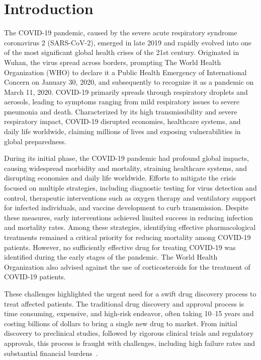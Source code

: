 \section{Introduction}
\label{chap:Introduction}

The COVID-19 pandemic, caused by the severe acute respiratory syndrome coronavirus 2 (SARS-CoV-2), emerged in late 2019 and rapidly evolved into one of the most significant global health crises of the 21st century. Originated in Wuhan, the virus spread across borders, prompting The World Health Organization (WHO) to declare it a Public Health Emergency of International Concern on January 30, 2020, and subsequently to recognize it as a pandemic on March 11, 2020. 
COVID-19 primarily spreads through respiratory droplets and aerosols, leading to symptoms ranging from mild respiratory issues to severe pneumonia and death. 
Characterized by its high transmissibility and severe respiratory impact, COVID-19 disrupted economies, healthcare systems, and daily life worldwide, claiming millions of lives and exposing vulnerabilities in global preparedness.

During its initial phase, the COVID-19 pandemic had profound global impacts, causing widespread morbidity and mortality, straining healthcare systems, and disrupting economies and daily life worldwide. Efforts to mitigate the crisis focused on multiple strategies, including diagnostic testing for virus detection and control, therapeutic interventions such as oxygen therapy and ventilatory support for infected individuals, and vaccine development to curb transmission. Despite these measures, early interventions achieved limited success in reducing infection and mortality rates. Among these strategies, identifying effective pharmacological treatments remained a critical priority for reducing mortality among COVID-19 patients. However, no sufficiently effective drug for treating COVID-19 was identified during the early stages of the pandemic. The World Health Organization also advised against the use of corticosteroids for the treatment of COVID-19 patients.

These challenges highlighted the urgent need for a swift drug discovery process to treat affected patients. %
The traditional drug discovery and approval process is time consuming, expensive, and high-risk endeavor, often taking 10--15 years and costing billions of dollars to bring a single new drug to market. From initial discovery to preclinical studies, followed by rigorous clinical trials and regulatory approvals, this process is fraught with challenges, including high failure rates and substantial financial burdens~\cite{adams2006estimating, dickson2009cost, dimasi2003price}.

